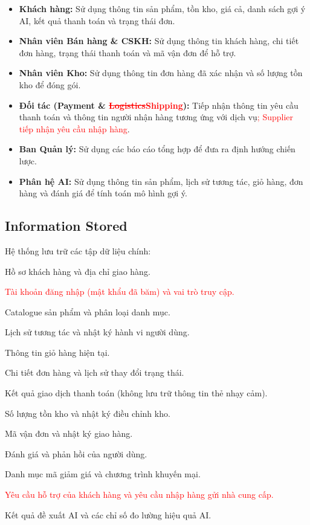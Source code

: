 \documentclass[12pt,a4paper,oneside]{report}
\newif\ifmark \marktrue
\newcommand{\chg}[1]{\ifmark\textcolor{red}{#1}\else #1\fi}
\newcommand{\del}[1]{\ifmark\textcolor{red}{\sout{#1}}\fi}
\begin{document}
\begin{itemize}
  \item \textbf{Khách hàng:} Sử dụng thông tin sản phẩm, tồn kho, giá cả, danh sách gợi ý AI, kết quả thanh toán và trạng thái đơn.
  \item \textbf{Nhân viên Bán hàng \& CSKH:} Sử dụng thông tin khách hàng, chi tiết đơn hàng, trạng thái thanh toán và mã vận đơn để hỗ trợ.
  \item \textbf{Nhân viên Kho:} Sử dụng thông tin đơn hàng đã xác nhận và số lượng tồn kho để đóng gói.
  \item \textbf{Đối tác (Payment \& \del{Logistics}\chg{Shipping}):} Tiếp nhận thông tin yêu cầu thanh toán và thông tin người nhận hàng tương ứng với dịch vụ\chg{; Supplier tiếp nhận yêu cầu nhập hàng}.
  \item \textbf{Ban Quản lý:} Sử dụng các báo cáo tổng hợp để đưa ra định hướng chiến lược.
  \item \textbf{Phân hệ AI:} Sử dụng thông tin sản phẩm, lịch sử tương tác, giỏ hàng, đơn hàng và đánh giá để tính toán mô hình gợi ý.
\end{itemize}

\subsection{Information Stored}

Hệ thống lưu trữ các tập dữ liệu chính:

\begin{itemize}
  \item Hồ sơ khách hàng và địa chỉ giao hàng.
  \chg{\item Tài khoản đăng nhập (mật khẩu đã băm) và vai trò truy cập.}
  \item Catalogue sản phẩm và phân loại danh mục.
  \item Lịch sử tương tác và nhật ký hành vi người dùng.
  \item Thông tin giỏ hàng hiện tại.
  \item Chi tiết đơn hàng và lịch sử thay đổi trạng thái.
  \item Kết quả giao dịch thanh toán (không lưu trữ thông tin thẻ nhạy cảm).
  \item Số lượng tồn kho và nhật ký điều chỉnh kho.
  \item Mã vận đơn và nhật ký giao hàng.
  \item Đánh giá và phản hồi của người dùng.
  \item Danh mục mã giảm giá và chương trình khuyến mại.
  \chg{\item Yêu cầu hỗ trợ của khách hàng và yêu cầu nhập hàng gửi nhà cung cấp.}
  \item Kết quả đề xuất AI và các chỉ số đo lường hiệu quả AI.
\end{itemize}
\end{document}
